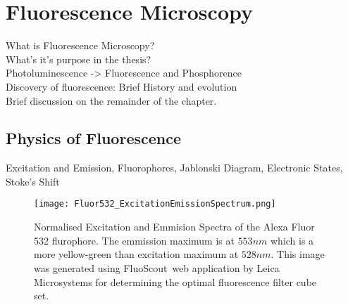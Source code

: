 
\chapter{Fluorescence Microscopy} %

\label{chap:Chapter2} %

\citep{Nobel2016}
\citep{AbramowitzDavidson2016}
\citep{Biehlmaier2013}
\citep{Svoboda2007}
\citep{Svoboda2009}
\citep{WuMerchantCastleman2008}
\citep{GonzalezWoods2002}
\citep{Pratt2001}
\citep{Soile2004}
\citep{Murphy2001}
\citep{Matula2006}
\citep{Rohr2010}
\citep{Matula2000}
\citep{Sarder2006}
\citep{Vu2008}
\citep{Kolmogorov2004}
\citep{Kozubek2001}
\citep{Petran1985}


What is Fluorescence Microscopy?\\
What's it's purpose in the thesis?\\
Photoluminescence -> Fluorescence and Phosphorence\\
Discovery of fluorescence: Brief History and evolution\\
Brief discussion on the remainder of the chapter.


\section{Physics of Fluorescence}
\label{sec:PhysicsOfFluorescence}

Excitation and Emission, Fluorophores, Jablonski Diagram, Electronic States, Stoke's Shift
\begin{figure}[!h]
	\centering
	\texttt{[image: Fluor532\_ExcitationEmissionSpectrum.png]}
	\caption{Normalised Excitation and Emmision Spectra of the Alexa Fluor 532 flurophore. The emmission maximum is at $553nm$ which is a more yellow-green than excitation maximum at $528nm$. This image was generated using FluoScout\texttrademark\, web application by Leica Microsystems for determining the optimal fluorescence filter cube set. %
	}
	\label{fig:excitationandemissionspectra}
\end{figure}

